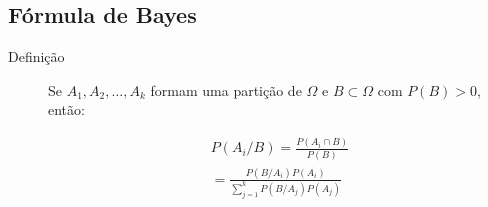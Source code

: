 \documentclass[11pt,a4paper]{book}
\begin{document}
     \subsection{Fórmula de Bayes}
     \begin{description}
       \item [Definição] Se $A_1,A_2,\ldots, A_k$ formam uma partição de $\Omega$ e 
 $B \subset \Omega$ com $P(B)>0$, então:

 \begin{align}
   P(A_i/ B)= \frac{P(A_i \cap B)}{P(B)}\\ \nonumber
   =\frac{P(B/A_i)P(A_i)}{\sum_{j=1}^k P(B/A_j)P(A_j)}
 \end{align}





\end{description}
\end{document}

